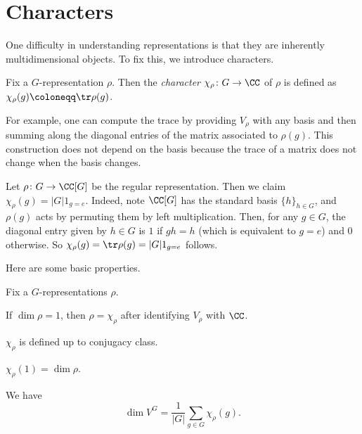 \documentclass[../main.tex]{subfiles}
\begin{document}
\section{Characters}
One difficulty in understanding representations is that they are inherently multidimensional objects. To fix this, we introduce characters.
\begin{definition}[character]
	Fix a $G$-representation $\rho$. Then the \textit{character} $\chi_\rho\colon G\to\CC$ of $\rho$ is defined as $\chi_\rho(g)\coloneqq\tr\rho(g)$.
\end{definition}
For example, one can compute the trace by providing $V_\rho$ with any basis and then summing along the diagonal entries of the matrix associated to $\rho(g)$. This construction does not depend on the basis because the trace of a matrix does not change when the basis changes.
\begin{example} \label{ex:regular-character}
	Let $\rho\colon G\to\CC[G]$ be the regular representation. Then we claim $\chi_\rho(g)=|G|1_{g=e}$. Indeed, note $\CC[G]$ has the standard basis $\{h\}_{h\in G}$, and $\rho(g)$ acts by permuting them by left multiplication. Then, for any $g\in G$, the diagonal entry given by $h\in G$ is $1$ if $gh=h$ (which is equivalent to $g=e$) and $0$ otherwise. So $\chi_\rho(g)=\tr\rho(g)=|G|1_{g=e}$ follows.
\end{example}
Here are some basic properties.
\begin{lemma} \label{lem:char-comps}
	Fix a $G$-representations $\rho$.
	\begin{listalph}
		\item If $\dim\rho=1$, then $\rho=\chi_\rho$ after identifying $V_\rho$ with $\CC$.
		\item $\chi_\rho$ is defined up to conjugacy class.
		\item $\chi_\rho(1)=\dim\rho$.
		\item We have
		\[\dim V^G=\frac1{|G|}\sum_{g\in G}\chi_\rho(g).\]
	\end{listalph}
\end{lemma}
\end{document}
